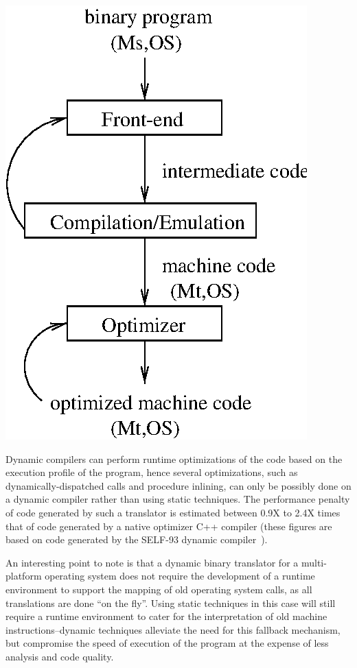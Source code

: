 \centerfigbegin
\resizebox{!}{6cm}
{\includegraphics{figures/dynamic.eps}}
 
Dynamic compilers can perform runtime optimizations of the code based
on the execution profile of the program, hence several optimizations,
such as dynamically-dispatched calls and procedure inlining, can only be
possibly done on a dynamic compiler rather than using static techniques.
The performance penalty of code generated by such a translator is estimated
between 0.9X to 2.4X times that of code generated by a native optimizer
C++ compiler (these figures are based on code generated by the SELF-93 dynamic
compiler~\cite{Holz95}).
 
An interesting point to note is that a dynamic binary translator for
a multi-platform operating system does not require the development of
a runtime environment to support the mapping of old operating system
calls, as all translations are done ``on the fly''.  Using static techniques
in this case will still require a runtime environment to cater for the
interpretation of old machine instructions--dynamic techniques alleviate
the need for this fallback mechanism, but compromise the speed of 
execution of the program at the expense of less analysis and code
quality.
 


